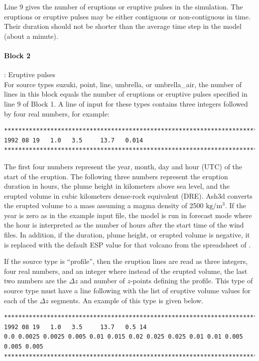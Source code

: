 Line 9 gives the number of eruptions or eruptive pulses in the simulation. The eruptions or eruptive pulses may be either contiguous or non-contiguous in time. Their duration should not be shorter than the average time step in the model (about a minute).

\paragraph{Block 2}: Eruptive pulses\\
For source types suzuki, point, line, umbrella, or umbrella\_air,
the number of lines in this block equals the number of eruptions or eruptive pulses specified in line 9 of Block 1. A line of input for these types contains three integers followed by four real numbers, for example:
\small
\begin{verbatim}
*******************************************************************************
1992 08 19   1.0   3.5     13.7   0.014
*******************************************************************************
\end{verbatim}
\normalsize

The first four numbers represent the year, month, day and hour (UTC) of the start of the eruption. The following three numbers represent the eruption duration in hours, the plume height in kilometers above sea level, and the erupted volume in cubic kilometers dense-rock equivalent (DRE). Ash3d converts the erupted volume to a mass assuming a magma density of 2500 $\mathrm{kg/m^3}$. If the year is zero as in the example input file, the model is run in forecast mode where the hour is interpreted as the number of hours after the start time of the wind files. In addition, if the duration, plume height, or erupted volume is negative, it is replaced with the default ESP value for that volcano from the spreadsheet of \cite{Mastin09b}.

If the source type is ``profile'', then the eruption lines are read as three integers, four real numbers, and an integer where instead of the erupted volume, the last two numbers are the $\Delta z$ and number of $z$-points defining the profile.  This type of source type must have a line following with the list of eruptive volume values for each of the $\Delta z$ segments.  An example of this type is given below.
\small
\begin{verbatim}
*******************************************************************************
1992 08 19   1.0   3.5     13.7   0.5 14
0.0 0.0025 0.0025 0.005 0.01 0.015 0.02 0.025 0.025 0.01 0.01 0.005 0.005 0.005
*******************************************************************************
\end{verbatim}
\normalsize

